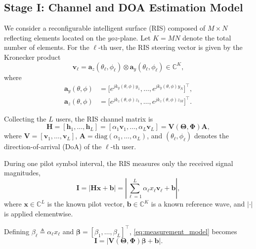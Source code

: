 \documentclass[journal]{IEEEtran}
\begin{document}
\subsection{Stage I: Channel and DOA Estimation Model}
We consider a reconfigurable intelligent surface (RIS) composed of
$M\times N$ reflecting elements located on the $yoz$-plane.
Let $K=MN$ denote the total number of elements.
For the $\ell$-th user, the RIS steering vector is given by the
Kronecker product
%
\begin{equation}
\mathbf v_\ell
=
\mathbf a_{z}(\theta_\ell,\phi_\ell)
\otimes
\mathbf a_{y}(\theta_\ell,\phi_\ell)
\in \mathbb C^{K},
\end{equation}
%
where
%
\begin{align}
\mathbf a_{y}(\theta,\phi)
&=
\big[
e^{j k_{y}(\theta,\phi)y_1},
\ldots,
e^{j k_{y}(\theta,\phi)y_N}
\big]^{\top},\\
\mathbf a_{z}(\theta,\phi)
&=
\big[
e^{j k_{z}(\theta,\phi)z_1},
\ldots,
e^{j k_{z}(\theta,\phi)z_M}
\big]^{\top}.
\end{align}

Collecting the $L$ users, the RIS channel matrix is
%
\begin{equation}
\mathbf H
=
[\mathbf h_1,\ldots,\mathbf h_L]
=
[\alpha_1\mathbf v_1,\ldots,\alpha_L\mathbf v_L]
=
\mathbf V(\boldsymbol\Theta,\boldsymbol\Phi)\mathbf A,
\label{eq:H_def}
\end{equation}
%
where
$\mathbf V=[\mathbf v_1,\ldots,\mathbf v_L]$,
$\mathbf A=\mathrm{diag}(\alpha_1,\ldots,\alpha_L)$,
and $(\theta_\ell,\phi_\ell)$ denotes the direction-of-arrival (DoA)
of the $\ell$-th user.

During one pilot symbol interval, the RIS measures only the received
signal magnitudes,
%
\begin{equation}
\mathbf I
=
\big|
\mathbf H\mathbf x + \mathbf b
\big|
=
\left|
\sum_{\ell=1}^{L} \alpha_\ell x_\ell \mathbf v_\ell + \mathbf b
\right|,
\label{eq:measurement_model}
\end{equation}
%
where $\mathbf x\in\mathbb C^{L}$ is the known pilot vector,
$\mathbf b\in\mathbb C^{K}$ is a known reference wave,
and $|\cdot|$ is applied elementwise.

Defining $\beta_\ell \triangleq \alpha_\ell x_\ell$ and
$\boldsymbol\beta=[\beta_1,\ldots,\beta_L]^{\top}$,
\eqref{eq:measurement_model} becomes
%
\begin{equation}
\mathbf I
=
\big|
\mathbf V(\boldsymbol\Theta,\boldsymbol\Phi)\boldsymbol\beta
+
\mathbf b
\big|.
\label{eq:compact_model}
\end{equation}
\end{document}

